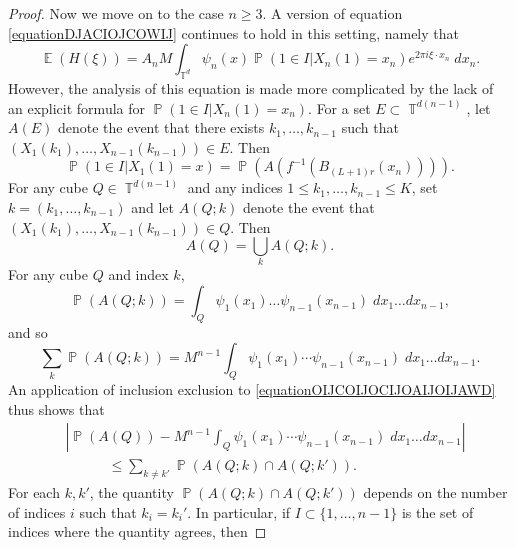 \documentclass[dvipsnames,letterpaper,12pt]{article}
\numberwithin{equation}{section}
\DeclareMathOperator{\TT}{\mathbb{T}}
\numberwithin{theorem}{section}
\DeclareMathOperator{\EE}{\mathbb{E}}
\DeclareMathOperator{\PP}{\mathbb{P}}
\begin{document}
\begin{proof}
    Now we move on to the case $n \geq 3$. A version of equation \eqref{equationDJACIOJCOWIJ} continues to hold in this setting, namely that
    \begin{equation} \label{equationGGIJICJIjjpopwaowarr}
        \EE(H(\xi)) = A_n M \int_{\TT^d} \psi_n(x) \PP(1 \in I| X_n(1) = x_n) e^{2 \pi i \xi \cdot x_n}\; dx_n.
    \end{equation}
    However, the analysis of this equation is made more complicated by the lack of an explicit formula for $\PP(1 \in I|X_n(1) = x_n)$. For a set $E \subset \TT^{d(n-1)}$, let $A(E)$ denote the event that there exists $k_1,\dots,k_{n-1}$ such that $(X_1(k_1),\dots,X_{n-1}(k_{n-1})) \in E$. Then
    \begin{equation}
        \PP( 1 \in I | X_1(1) = x ) = \PP(A(f^{-1}(B_{(L+1)r}(x_n)))).
    \end{equation}
    For any cube $Q \in \TT^{d(n-1)}$ and any indices $1 \leq k_1,\dots,k_{n-1} \leq K$, set $k = (k_1,\dots,k_{n-1})$ and let $A(Q;k)$ denote the event that $(X_1(k_1),\dots,X_{n-1}(k_{n-1})) \in Q$. Then
    \begin{equation}
        A(Q) = \bigcup_k A(Q;k).
    \end{equation}
    For any cube $Q$ and index $k$,
    \begin{equation}
        \PP(A(Q;k)) = \int_Q \psi_1(x_1) \dots \psi_{n-1}(x_{n-1})\; dx_1 \dots dx_{n-1},
    \end{equation}
    and so
    \begin{equation} \label{equationOIJCOIJOCIJOAIJOIJAWD}
        \sum_k \PP(A(Q;k)) = M^{n-1} \int_Q \psi_1(x_1) \cdots \psi_{n-1}(x_{n-1})\; dx_1 \dots dx_{n-1}.
    \end{equation}
    An application of inclusion exclusion to \eqref{equationOIJCOIJOCIJOAIJOIJAWD} thus shows that
    \begin{equation} \label{equationIOJVOIVJOVIJPSPOPCOISAPCOIACC}
    \begin{split}
        &\left| \PP(A(Q)) - M^{n-1} \int_Q \psi_1(x_1) \cdots \psi_{n-1}(x_{n-1})\; dx_1 \dots dx_{n-1} \right|\\
        &\quad\quad\quad\leq \sum_{k \neq k'} \PP(A(Q;k) \cap A(Q;k')).
    \end{split}
    \end{equation}
    For each $k,k'$, the quantity $\PP(A(Q;k) \cap A(Q;k'))$ depends on the number of indices $i$ such that $k_i = k_i'$. In particular, if $I \subset \{ 1, \dots, n-1 \}$ is the set of indices where the quantity agrees, then

\end{proof}
\end{document}
